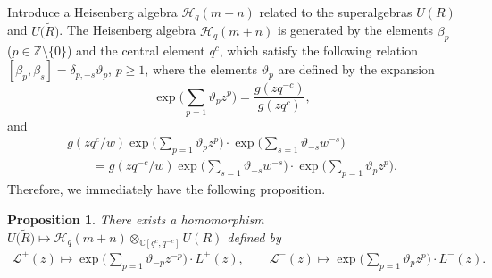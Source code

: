 \documentclass[pdftex]{sigma}
\numberwithin{equation}{section}
\newtheorem{Proposition}[Theorem]{Proposition}
 { \theoremstyle{definition}
\newtheorem{Definition}[Theorem]{Definition}
\newtheorem{Note}[Theorem]{Note}
\newtheorem{Example}[Theorem]{Example}
\newtheorem{Remark}[Theorem]{Remark} }
\begin{document}
Introduce a Heisenberg algebra $\mathcal{H}_q(m+n)$ related to the superalgebras $U(R)$ and $U\bigl(\widetilde{R}\bigr)$. The Heisenberg algebra $\mathcal{H}_q(m+n)$ is generated by the elements $\beta_p$ ($p\in\mathbb{Z}\setminus\{0\}$) and the central element $q^c$, which satisfy the following relation
$ [\beta_p, \beta_s]=\delta_{p,-s}\vartheta_p$, $ p\geq1$,
where the elements $\vartheta_p$ are defined by the expansion
\[
\exp\biggl(\sum_{p=1}\vartheta_pz^p\biggr)=\frac{g(zq^{-c})}{g(zq^c)},
\]
and
\begin{gather*}%
 g(zq^{c}/w) \exp\biggl(\sum_{p=1}\vartheta_p z^p\biggr) \cdot \exp\biggl(\sum_{s=1}\vartheta_{-s}w^{-s}\biggr)\\
 \qquad=g(zq^{-c}/w)\exp\biggl(\sum_{s=1}\vartheta_{-s}w^{-s}\biggr) \cdot \exp\biggl(\sum_{p=1}\vartheta_pz^p\biggr).
\end{gather*}
Therefore, we immediately have the following proposition.
\begin{Proposition}\label{Apr3}
There exists a homomorphism $U\bigl(\widetilde{R}\bigr)\mapsto\mathcal{H}_q(m+n)\otimes_{\mathbb{C}[q^c, q^{-c}]} U(R)$ defined by
\begin{gather*}
\mathcal{L}^+(z)\mapsto \exp\biggl(\sum_{p=1}\vartheta_{-p}z^{-p}\biggr) \cdot L^+(z),\qquad \mathcal{L}^-(z)\mapsto \exp\biggl(\sum_{p=1}\vartheta_{p}z^{p}\biggr) \cdot L^-(z).
\end{gather*}
\end{Proposition}
\end{document}
